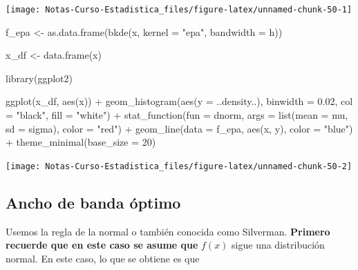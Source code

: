 \documentclass[
  12pt,
]{book}
\newenvironment{Shaded}{\begin{snugshade}}{\end{snugshade}}
\newcommand{\AttributeTok}[1]{\textcolor[rgb]{0.77,0.63,0.00}{#1}}
\newcommand{\DecValTok}[1]{\textcolor[rgb]{0.00,0.00,0.81}{#1}}
\newcommand{\FloatTok}[1]{\textcolor[rgb]{0.00,0.00,0.81}{#1}}
\newcommand{\FunctionTok}[1]{\textcolor[rgb]{0.00,0.00,0.00}{#1}}
\newcommand{\NormalTok}[1]{#1}
\newcommand{\OtherTok}[1]{\textcolor[rgb]{0.56,0.35,0.01}{#1}}
\newcommand{\SpecialCharTok}[1]{\textcolor[rgb]{0.00,0.00,0.00}{#1}}
\newcommand{\StringTok}[1]{\textcolor[rgb]{0.31,0.60,0.02}{#1}}
\begin{document}
\begin{center}\texttt{[image: Notas-Curso-Estadistica\_files/figure-latex/unnamed-chunk-50-1]} \end{center}

\begin{Shaded}
\begin{Highlighting}[]
\NormalTok{f\_epa }\OtherTok{\textless{}{-}} \FunctionTok{as.data.frame}\NormalTok{(}\FunctionTok{bkde}\NormalTok{(x, }\AttributeTok{kernel =} \StringTok{"epa"}\NormalTok{, }\AttributeTok{bandwidth =}\NormalTok{ h))}

\NormalTok{x\_df }\OtherTok{\textless{}{-}} \FunctionTok{data.frame}\NormalTok{(x)}

\FunctionTok{library}\NormalTok{(ggplot2)}

\FunctionTok{ggplot}\NormalTok{(x\_df, }\FunctionTok{aes}\NormalTok{(x)) }\SpecialCharTok{+} \FunctionTok{geom\_histogram}\NormalTok{(}\FunctionTok{aes}\NormalTok{(}\AttributeTok{y =}\NormalTok{ ..density..),}
    \AttributeTok{binwidth =} \FloatTok{0.02}\NormalTok{, }\AttributeTok{col =} \StringTok{"black"}\NormalTok{, }\AttributeTok{fill =} \StringTok{"white"}\NormalTok{) }\SpecialCharTok{+}
    \FunctionTok{stat\_function}\NormalTok{(}\AttributeTok{fun =}\NormalTok{ dnorm, }\AttributeTok{args =} \FunctionTok{list}\NormalTok{(}\AttributeTok{mean =}\NormalTok{ mu,}
        \AttributeTok{sd =}\NormalTok{ sigma), }\AttributeTok{color =} \StringTok{"red"}\NormalTok{) }\SpecialCharTok{+} \FunctionTok{geom\_line}\NormalTok{(}\AttributeTok{data =}\NormalTok{ f\_epa,}
    \FunctionTok{aes}\NormalTok{(x, y), }\AttributeTok{color =} \StringTok{"blue"}\NormalTok{) }\SpecialCharTok{+} \FunctionTok{theme\_minimal}\NormalTok{(}\AttributeTok{base\_size =} \DecValTok{20}\NormalTok{)}
\end{Highlighting}
\end{Shaded}

\begin{center}\texttt{[image: Notas-Curso-Estadistica\_files/figure-latex/unnamed-chunk-50-2]} \end{center}

\hypertarget{ancho-de-banda-uxf3ptimo-1}{%
\subsection{Ancho de banda óptimo}\label{ancho-de-banda-uxf3ptimo-1}}

Usemos la regla de la normal o también conocida como Silverman.
\textbf{Primero recuerde que en este caso se asume que} \(f(x)\) sigue
una distribución normal. En este caso, lo que se obtiene es que
\end{document}
